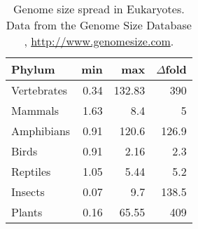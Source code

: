 \begin{table}[h]
\centering
\caption[Genome size spread in Eukaryotes]{Genome size spread in Eukaryotes. Data from the Genome Size Database \citep{Gregory2018}, \url{http://www.genomesize.com}.}
\label{tab:genome-size-spread}
\begin{tabular}{@{}lrrr@{}}
\toprule
Phylum       & min   &   max  & $\Delta$fold \\
\midrule
Vertebrates  & 0.34  & 132.83 &          390 \\
Mammals      & 1.63  &    8.4 &            5 \\
Amphibians   & 0.91  &  120.6 &        126.9 \\
Birds        & 0.91  &   2.16 &          2.3 \\
Reptiles     & 1.05  &   5.44 &          5.2 \\
Insects      & 0.07  &    9.7 &        138.5 \\
Plants       & 0.16  &  65.55 &          409 \\
\bottomrule
\end{tabular}
\end{table}



